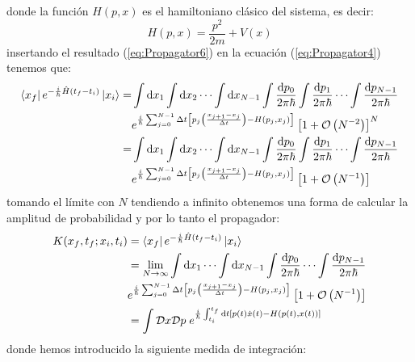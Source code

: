 \documentclass[11pt,a4paper]{article}
\begin{document}
donde la funci\'on $H(p,x)$ es el hamiltoniano cl\'asico del sistema, es decir:
\begin{equation}
H(p,x) = \frac{p^2}{2m} + V(x)
\label{eq:classicamiltonian}
\end{equation}
insertando el resultado (\ref{eq:Propagator6}) en la ecuaci\'on (\ref{eq:Propagator4}) tenemos que:
\begin{equation}
\begin{split}
\bra{x_f}e^{-\frac{i}{\hbar}\hat{H} (t_f - t_i)}\ket{x_i} = & \int \mathrm{d}x_1 \int \mathrm{d}x_2 \cdots \int \mathrm{d}x_{N-1} \int \frac{\mathrm{d}p_0}{2\pi\hbar} \int \frac{\mathrm{d}p_1}{2\pi\hbar} \cdots \int \frac{\mathrm{d}p_{N-1}}{2\pi\hbar} \\
& e^{\frac{i}{\hbar}\sum_{j=0}^{N-1}\Delta t\left[p_j\left( \frac{x_{j+1}-x_j}{\Delta t} \right) - H(p_j,x_j)\right]} \left[ 1 + \mathcal{O} \left( N^{-2} \right) \right]^N \\
= & \int \mathrm{d}x_1 \int \mathrm{d}x_2 \cdots \int \mathrm{d}x_{N-1} \int \frac{\mathrm{d}p_0}{2\pi\hbar} \int \frac{\mathrm{d}p_1}{2\pi\hbar} \cdots \int \frac{\mathrm{d}p_{N-1}}{2\pi\hbar} \\
& e^{\frac{i}{\hbar}\sum_{j=0}^{N-1}\Delta t\left[p_j\left( \frac{x_{j+1}-x_j}{\Delta t} \right) - H(p_j,x_j)\right]} \left[ 1 + \mathcal{O} \left( N^{-1} \right) \right]
\end{split}
\label{eq:Propagator7}
\end{equation}
tomando el l\'imite con $N$ tendiendo a infinito obtenemos una forma de calcular la amplitud de probabilidad y por lo tanto el propagador:
\begin{equation}
\begin{split}
K(x_f,t_f; x_i,t_i) & = \bra{x_f}e^{-\frac{i}{\hbar}\hat{H} (t_f - t_i)}\ket{x_i} \\
& = \lim_{N\rightarrow \infty}\int \mathrm{d}x_1 \cdots \int \mathrm{d}x_{N-1} \int \frac{\mathrm{d}p_0}{2\pi\hbar} \cdots \int \frac{\mathrm{d}p_{N-1}}{2\pi\hbar} \\
& e^{\frac{i}{\hbar}\sum_{j=0}^{N-1}\Delta t\left[p_j\left( \frac{x_{j+1}-x_j}{\Delta t} \right) - H(p_j,x_j)\right]} \left[ 1 + \mathcal{O} \left( N^{-1} \right) \right] \\
& = \int\mathcal{D}x\mathcal{D}p \; e^{\frac{i}{\hbar}\int_{t_i}^{t_f}\mathrm{d}t\left[ p(t)\dot{x}(t)-H(p(t),x(t))\right]}
\end{split}
\label{eq:Propagator8}
\end{equation}
donde hemos introducido la siguiente medida de integración:
\end{document}

